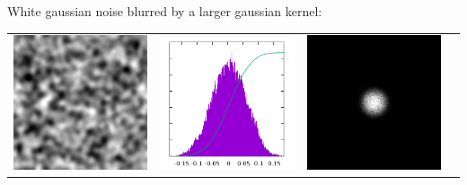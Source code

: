 


White gaussian noise blurred by a larger gaussian kernel:

\begin{tabular}{cccc}
	\includegraphics{B256.png} &
	\includegraphics{B256_h.png} &
	\includegraphics{B256_f.png} &

\end{tabular}
